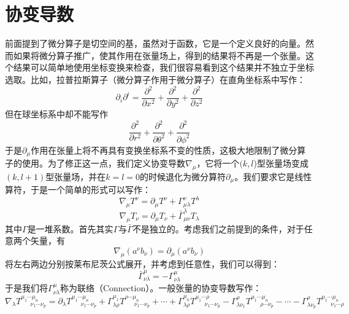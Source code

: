 \documentclass{ctexart}
\begin{document}
\section{协变导数}
前面提到了微分算子是切空间的基，虽然对于函数，它是一个定义良好的向量。然而如果将微分算子推广，使其作用在张量场上，得到的结果将不再是一个张量。这个结果可以简单地使用坐标变换来检查，我们很容易看到这个结果并不独立于坐标选取。比如，拉普拉斯算子（微分算子作用于微分算子）在直角坐标系中写作：
\begin{equation}
\partial_i\partial^i=\frac{\partial^2}{\partial x^2}+\frac{\partial^2}{\partial y^2}+\frac{\partial^2}{\partial z^2}
\end{equation}
但在球坐标系中却不能写作
\begin{equation}
\frac{\partial^2}{\partial r^2}+\frac{\partial^2}{\partial \theta^2}+\frac{\partial^2}{\partial \phi^2}
\end{equation}
于是$\partial_\mu$作用在张量上将不再具有变换坐标系不变的性质，这极大地限制了微分算子的使用。为了修正这一点，我们定义协变导数$\nabla_\mu$，它将一个$(k,l$)型张量场变成$(k,l+1)$型张量场，并在$k=l=0$的时候退化为微分算符$\partial_\mu$。我们要求它是线性算符，于是一个简单的形式可以写作：
\begin{equation}
\nabla_\mu T^\nu=\partial_\mu T^\nu+\Gamma_{\mu\lambda}^\nu T^\lambda
\end{equation}
\begin{equation}
\nabla_\mu T_\nu=\partial_\mu T_\nu+\bar{\Gamma}_{\mu\nu}^\lambda T_\lambda
\end{equation}
其中$\Gamma$是一堆系数。首先其实$\Gamma$与$\bar{\Gamma}$不是独立的。考虑我们之前提到的条件，对于任意两个矢量，有
\begin{equation}
\nabla_\mu(a^\nu b_\nu)=\partial_\mu(a^\nu b_\nu)
\end{equation}
将左右两边分别按莱布尼茨公式展开，并考虑到任意性，我们可以得到：
\begin{equation}
\bar{\Gamma}^{\mu}_{\nu\lambda}=-\Gamma^{\mu}_{\nu\lambda}
\end{equation}
于是我们将$\Gamma^\mu_{\nu\lambda}$称为联络（Connection）。一般张量的协变导数写作：
\begin{equation}
\nabla_{\lambda}T^{\mu_1\cdots\mu_n}_{\ \ \ \ \ \ \ \nu_1\cdots\nu_p}=\partial_{\lambda}T^{\mu_1\cdots\mu_n}_{\ \ \ \ \ \ \ \nu_1\cdots\nu_p}+\Gamma^{\mu_1}_{\lambda\rho}T^{\rho\cdots\mu_n}_{\ \ \ \ \ \ \ \nu_1\cdots\nu_p}+\cdots+\Gamma^{\mu_n}_{\lambda\rho}T^{\mu_1\cdots\rho}_{\ \ \ \ \ \ \ \nu_1\cdots\nu_p}-\Gamma^\rho_{\lambda\nu_1}T^{\mu_1\cdots\mu_n}_{\ \ \ \ \ \ \ \rho\cdots\nu_p}-\cdots-\Gamma^\rho_{\lambda\nu_p}T^{\mu_1\cdots\mu_n}_{\ \ \ \ \ \ \ \nu_1\cdots\rho}
\end{equation}
\end{document}
